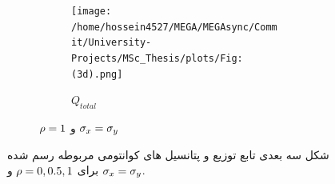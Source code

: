 \documentclass[a4paper,titlepage,12pt,fleqn,oneside]{report}
\begin{document}
\begin{figure}[tbp]
\begin{subfigure}[b]{\textwidth}
\begin{subfigure}[b]{0.24\textwidth}
  		\end{subfigure}
  		\hfill
  		\begin{subfigure}[b]{0.24\textwidth}
  			\renewcommand\thesubfigure{iv}
  			\centering
  			\texttt{[image: /home/hossein4527/MEGA/MEGAsync/Commit/University-Projects/MSc\_Thesis/plots/Fig:(3d).png]}
  			\caption{$Q_{total}$}
  			\label{fig:1.3.4}
  		\end{subfigure}
  		\caption{$\protect\rho =1$ و $\protect\sigma _{x}=\protect\sigma _{y}$}
  		\label{fig:1.3}
  	\end{subfigure}	
  	\caption{  		شکل سه بعدی تابع توزیع و پتانسیل های کوانتومی مربوطه رسم شده برای 
  		 $\protect\rho =0, 0.5, 1$ و  $\protect\sigma _{x}=%
  		\protect\sigma _{y}$.}
  	\label{fig:1t}
  \end{figure}
  
\end{document}
